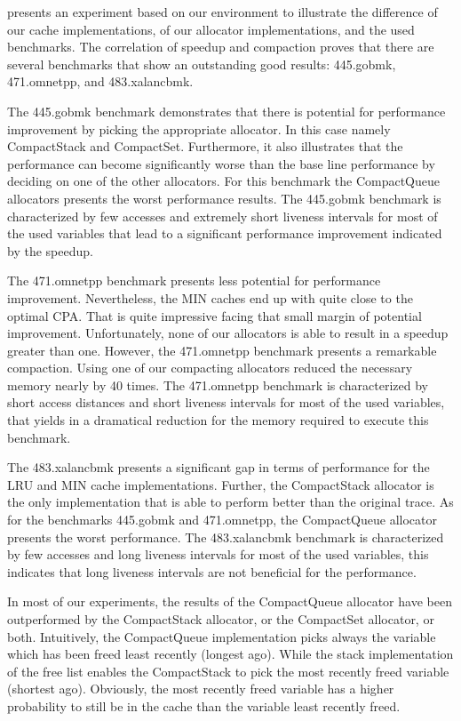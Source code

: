 \documentclass[onecolumn, openright, master, english, signatures]{dbrgrptt}
\begin{document}
 presents an experiment based on our environment to illustrate the difference of our cache implementations, of our allocator implementations, and the used benchmarks.
The correlation of speedup and compaction proves that there are several benchmarks that show an outstanding good results: 445.gobmk, 471.omnetpp, and 483.xalancbmk.

The 445.gobmk benchmark demonstrates that there is potential for performance improvement by picking the appropriate allocator.
In this case namely CompactStack and CompactSet.
Furthermore, it also illustrates that the performance can become significantly worse than the base line performance by deciding on one of the other allocators.
For this benchmark the CompactQueue allocators presents the worst performance results.
The 445.gobmk benchmark is characterized by few accesses and extremely short liveness intervals for most of the used variables that lead to a significant performance improvement indicated by the speedup.

The 471.omnetpp benchmark presents less potential for performance improvement.
Nevertheless, the \ac{MIN} caches end up with quite close to the optimal \ac{CPA}.
That is quite impressive facing that small margin of potential improvement.
Unfortunately, none of our allocators is able to result in a speedup greater than one.
However, the 471.omnetpp benchmark presents a remarkable compaction.
Using one of our compacting allocators reduced the necessary memory nearly by 40 times.
The 471.omnetpp benchmark is characterized by short access distances and short liveness intervals for most of the used variables, that yields in a dramatical reduction for the memory required to execute this benchmark.

The 483.xalancbmk presents a significant gap in terms of performance for the \ac{LRU} and \ac{MIN} cache implementations.
Further, the CompactStack allocator is the only implementation that is able to perform better than the original \ac{trace}.
As for the benchmarks 445.gobmk and 471.omnetpp, the CompactQueue allocator presents the worst performance.
The 483.xalancbmk benchmark is characterized by few accesses and long liveness intervals for most of the used variables, this indicates that long liveness intervals are not beneficial for the performance.

In most of our experiments, the results of the CompactQueue allocator have been outperformed by the CompactStack allocator, or the CompactSet allocator, or both.
Intuitively, the CompactQueue implementation picks always the variable which has been freed least recently (longest ago).
While the stack implementation of the free list enables the CompactStack to pick the most recently freed variable (shortest ago).
Obviously, the most recently freed variable has a higher probability to still be in the cache than the variable least recently freed.
\end{document}
